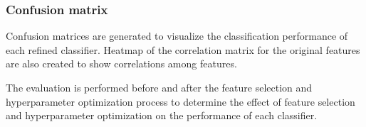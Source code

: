 	\subsubsection{Confusion matrix}
		Confusion matrices are generated to visualize the classification performance of each refined classifier. Heatmap of the correlation matrix for the original features are also created to show correlations among features. 

		The evaluation is performed before and after the feature selection and hyperparameter optimization process to determine the effect of feature selection and hyperparameter optimization on the performance of each classifier. 
	
